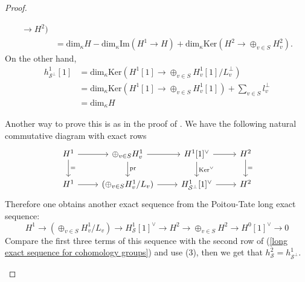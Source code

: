 \documentclass[12pt,oneside,reqno]{amsart}
\theoremstyle{plain}
\begin{document}
\begin{proof}
\begin{enumerate}
\begin{align*}
				\rightarrow
				H^2)
				\\
				&
				=
				\mathrm{dim}_\kappa
				H
				-
				\mathrm{dim}_\kappa
				\mathrm{Im}
				(
				H^1
				\rightarrow
				H
				)
				+
				\mathrm{dim}_\kappa
				\mathrm{Ker}
				(
				H^2
				\rightarrow
				\oplus_{v\in S}H^2_v
				).
			\end{align*}
			On the other hand,
			\begin{align*}
				h^1_{\mathcal{S}^\perp}[1]
				&
				=
				\mathrm{dim}_\kappa
				\mathrm{Ker}
				\left(
				H^1[1]
				\rightarrow
				\oplus_{v\in S}
				H^1_v[1]/L_v^\perp
				\right)
				\\
				&
				=
				\mathrm{dim}_\kappa
				\mathrm{Ker}
				\left(
				H^1[1]
				\rightarrow
				\oplus_{v\in S}
				H^1_v[1]
				\right)
				+
				\sum_{v\in S}
				l_v^\perp
				\\
				&
				=
				\mathrm{dim}_\kappa H
			\end{align*}
			
			
			
			
			
			
			
			
			
			
			
			Another way to prove this is
			as in the proof of
			\cite[Lemma 2.3.4]{ClozelHarrisTaylor2008}.
			We have the following natural commutative diagram
			with exact rows
			\[
			\begin{tikzcd}
				H^1
				\arrow[r]
				\arrow[d,"="]
				&
				\oplus_{v\in S}
				H^1_v
				\arrow[r]
				\arrow[d,"\mathrm{pr}"]
				&
				H^1[1]^\vee
				\arrow[r]
				\arrow[d,"\mathrm{Ker}^\vee"]
				&
				H^2
				\arrow[d,"="]
				\\
				H^1
				\arrow[r]
				&
				(\oplus_{v\in S}
				H^1_v/L_v)
				\arrow[r]
				&
				H^1_{\mathcal{S}^\perp}[1]^\vee
				\arrow[r]
				&
				H^2
			\end{tikzcd}
			\]
			Therefore one obtains
			another exact sequence
			from the Poitou-Tate long exact sequence:
			\[
			H^1
			\rightarrow
			(\oplus_{v\in S}
			H^1_v/L_v)
			\rightarrow
			H^1_{\mathcal{S}}[1]^\vee
			\rightarrow
			H^2
			\rightarrow
			\oplus_{v\in S}
			H^2
			\rightarrow
			H^0[1]^\vee
			\rightarrow
			0
			\]
			Compare the first three terms of
			this sequence with the second row of
			(\ref{long exact sequence for cohomology groups})
			and use (3),
			then we get that
			$h_{\mathcal{S}}^2
			=
			h_{\mathcal{S}^\perp}^1$.
			
			
			

\end{enumerate}
\end{proof}
\end{document}
